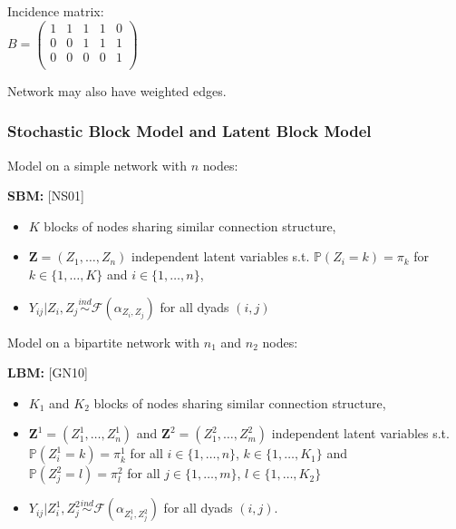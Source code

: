 \documentclass[nopagenumber,9pt]{beamer}
\renewcommand{\P}{\mathbb{P}}
\newcommand{\bZ}{\mathbf{Z}}
\newcommand{\citemano}[1]{\textcolor{dgreen}{#1}}
\begin{document}
\begin{frame}
\begin{minipage}{0.49\linewidth}
 \smallskip
 Incidence matrix:\\
 $B=\left(
\begin{array}{rrrrr}
 1 &   1 &   1 &   1 &   0 \\
   0 &   0 &   1 &   1 &   1 \\
   0 &   0 &   0 &   0 &   1 \\  \end{array}\right)
$
 \end{minipage}


 \bigskip

 Network may also have weighted edges.



\end{frame}




\begin{frame}
 \frametitle{Stochastic Block Model and Latent Block Model}

 Model on a simple network with $n$ nodes:

 \textbf{SBM:} \citemano{[NS01]}\\
 \begin{itemize}
 \item $K$ blocks of nodes sharing similar connection structure,
  \item $\bZ=(Z_1,\ldots,Z_n)$  independent latent variables s.t. $\P (Z_i=k)\overset{}{=} \pi_k$ for $k\in\{1,\ldots,K\}$ and $i\in\{1,\ldots,n\}$,
  \item $Y_{ij}|Z_i,Z_j\overset{ind}{\sim} \mathcal{F}(\alpha_{Z_i,Z_j})$ for all dyads $(i,j)$
 \end{itemize}



  \bigskip

  Model on a bipartite network with $n_1$ and $n_2$ nodes:

 \textbf{LBM:} \citemano{[GN10]}\\
 \begin{itemize}
 \item $K_1$ and $K_2$ blocks of nodes sharing similar connection structure,
 \item $\bZ^1=(Z^1_1,\ldots,Z^1_n)$ and $\bZ^2=(Z^2_1,\ldots,Z^2_m)$
 independent latent variables s.t.
 $\P(Z^1_i=k)=\pi^1_k$ for all $i\in\{1,\ldots,n\}$, $k\in\{1,\ldots,K_1\}$ and\\ $\P(Z^2_j=l)=\pi^2_l $ for all $j\in\{1,\ldots,m\}$, $l\in\{1,\ldots,K_2\}$
 \item $ Y_{ij}|Z^1_i,Z^2_j\overset{ind}{\sim} \mathcal{F}(\alpha_{Z^1_i,Z^2_j})$ for all dyads $(i,j)$.


 \end{itemize}



\end{frame}
\end{document}
